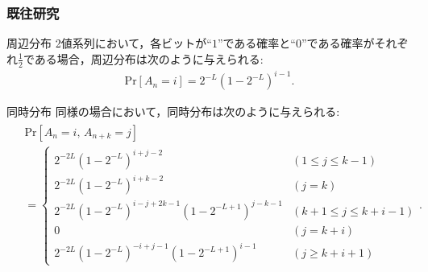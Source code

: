 \documentclass[dvipdfmx,11pt]{beamer}
\begin{document}
\begin{frame}[t]\frametitle{既往研究}
%
\begin{block}{周辺分布}
2値系列において，各ビットが``$1$''である確率と``$0$''である確率がそれぞれ$\frac{1}{2}$である場合，周辺分布は次のように与えられる:
\begin{align*}
  \mathrm{Pr}[A_n=i] = 2^{-L}(1-2^{-L})^{i-1}.
\end{align*}
\end{block}
%
%
\begin{block}{同時分布}
\scriptsize
同様の場合において，同時分布は次のように与えられる:
\begin{align*}\begin{split}
  &\mathrm{Pr}[A_n=i,\, A_{n+k}=j] \\
   &=\left\{ \begin{array}{ll}
    2^{-2L}(1-2^{-L})^{i+j-2} & (1 \leq j \leq k-1) \\
    2^{-2L}(1-2^{-L})^{i+k-2} & (j=k) \\
    2^{-2L}(1-2^{-L})^{i-j+2k-1} \left( 1 - 2^{-L+1} \right)^{j-k-1} & (k+1 \leq j \leq k+i-1) \\
    0 & (j=k+i) \\
    2^{-2L}(1-2^{-L})^{-i+j-1} \left( 1 - 2^{-L+1} \right)^{i-1} & (j \geq k+i+1) 
  \end{array} \right..
\end{split}\end{align*}
\normalsize
\end{block}
%
\end{frame}
\end{document}
